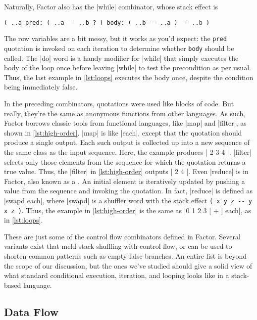 Naturally, Factor also has the \factor|while| combinator, whose stack effect is
%
\begin{center}
%
  \Verb|( ..a pred: ( ..a -- ..b ? ) body: ( ..b -- ..a ) -- ..b )|
%
\end{center}
%
\noindent The row variables are a bit messy, but it works as you'd expect: the
\Verb|pred| quotation is invoked on each iteration to determine whether
\Verb|body| should be called.  The \factor|do| word is a handy modifier for
\factor|while| that simply executes the body of the loop once before leaving
\factor|while| to test the precondition as per usual.  Thus, the last example
in \vref{lst:loops} executes the body once, despite the condition being
immediately false.

In the preceding combinators, quotations were used like blocks of code.  But
really, they're the same as anonymous functions from other languages.  As such,
Factor borrows classic tools from functional languages, like \factor|map| and
\factor|filter|, as shown in \vref{lst:high-order}.  \factor|map| is like
\factor|each|, except that the quotation should produce a single output.  Each
such output is collected up into a new sequence of the same class as the input
sequence.  Here, the example produces
%
\factor|{ 2 3 4 }|.
%
\factor|filter| selects only those elements from the sequence for which the
quotation returns a true value.  Thus, the \factor|filter| in
\vref{lst:high-order} outputs
%
\factor|{ 2 4 }|.
%
Even \factor|reduce| is in Factor, also known as a .  An
initial element is iteratively updated by pushing a value from the sequence and
invoking the quotation.  In fact, \factor|reduce| is defined as
%
\factor|swapd each|,
%
where \factor|swapd| is a shuffler word with the stack effect
%
\Verb|( x y z -- y x z )|.
%
Thus, the example in \vref{lst:high-order} is the same as
%
\factor|0 { 1 2 3 } [ + ] each|,
%
as in \vref{lst:loops}.


These are just some of the control flow combinators defined in Factor.  Several
variants exist that meld stack shuffling with control flow, or can be used to
shorten common patterns such as empty false branches.  An entire list is beyond
the scope of our discussion, but the ones we've studied should give a solid
view of what standard conditional execution, iteration, and looping looks like
in a stack-based language.

\subsection{Data Flow}\label{sec:primer:data-flow}

